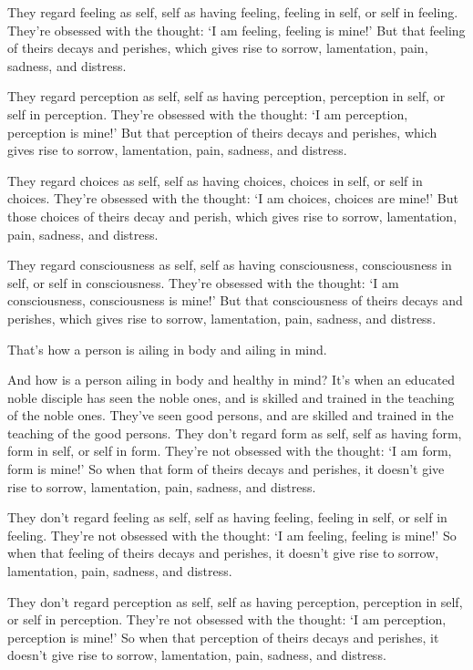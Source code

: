 \documentclass[12pt,openany]{book}%
\begin{document}
They regard feeling as self, self as having feeling, feeling in self, or self in feeling. They’re obsessed with the thought: ‘I am feeling, feeling is mine!’ But that feeling of theirs decays and perishes, which gives rise to sorrow, lamentation, pain, sadness, and distress. 

They regard perception as self, self as having perception, perception in self, or self in perception. They’re obsessed with the thought: ‘I am perception, perception is mine!’ But that perception of theirs decays and perishes, which gives rise to sorrow, lamentation, pain, sadness, and distress. 

They regard choices as self, self as having choices, choices in self, or self in choices. They’re obsessed with the thought: ‘I am choices, choices are mine!’ But those choices of theirs decay and perish, which gives rise to sorrow, lamentation, pain, sadness, and distress. 

They regard consciousness as self, self as having consciousness, consciousness in self, or self in consciousness. They’re obsessed with the thought: ‘I am consciousness, consciousness is mine!’ But that consciousness of theirs decays and perishes, which gives rise to sorrow, lamentation, pain, sadness, and distress. 

That’s how a person is ailing in body and ailing in mind. 

And how is a person ailing in body and healthy in mind? It’s when an educated noble disciple has seen the noble ones, and is skilled and trained in the teaching of the noble ones. They’ve seen good persons, and are skilled and trained in the teaching of the good persons. They don’t regard form as self, self as having form, form in self, or self in form. They’re not obsessed with the thought: ‘I am form, form is mine!’ So when that form of theirs decays and perishes, it doesn’t give rise to sorrow, lamentation, pain, sadness, and distress. 

They don’t regard feeling as self, self as having feeling, feeling in self, or self in feeling. They’re not obsessed with the thought: ‘I am feeling, feeling is mine!’ So when that feeling of theirs decays and perishes, it doesn’t give rise to sorrow, lamentation, pain, sadness, and distress. 

They don’t regard perception as self, self as having perception, perception in self, or self in perception. They’re not obsessed with the thought: ‘I am perception, perception is mine!’ So when that perception of theirs decays and perishes, it doesn’t give rise to sorrow, lamentation, pain, sadness, and distress. 
\end{document}
